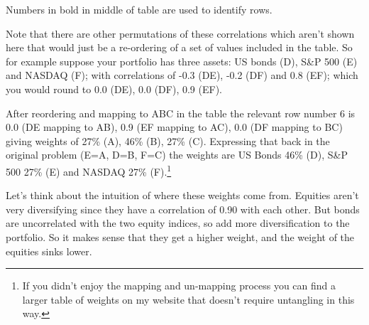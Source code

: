 {\setlength{\fboxsep}{7pt}\setlength{\arrayrulewidth}{0.5pt}}
\par
\endgroup

Numbers in bold in middle of table are used to identify rows.

Note that there are other permutations of these correlations which aren’t shown here that would just be a re-ordering of a set of values included in the table. So for example suppose your portfolio has three assets: US bonds (D), S\&P 500 (E) and NASDAQ (F); with correlations of -0.3 (DE), -0.2 (DF) and 0.8 (EF); which you would round to 0.0 (DE), 0.0 (DF), 0.9 (EF).

After reordering and mapping to ABC in the table the relevant row number 6 is 0.0 (DE mapping to AB), 0.9 (EF mapping to AC), 0.0 (DF mapping to BC) giving weights of 27\% (A), 46\% (B), 27\% (C). Expressing that back in the original problem (E=A, D=B, F=C) the weights are US Bonds 46\% (D), S\&P 500 27\% (E) and NASDAQ 27\% (F).\footnote{If you didn't enjoy the mapping and un-mapping process you can find a larger table of weights on my website that doesn't require untangling in this way.}

Let’s think about the intuition of where these weights come from. Equities aren’t very diversifying since they have a correlation of 0.90 with each other. But bonds are uncorrelated with the two equity indices, so add more diversification to the portfolio. So it makes sense that they get a higher weight, and the weight of the equities sinks lower.

